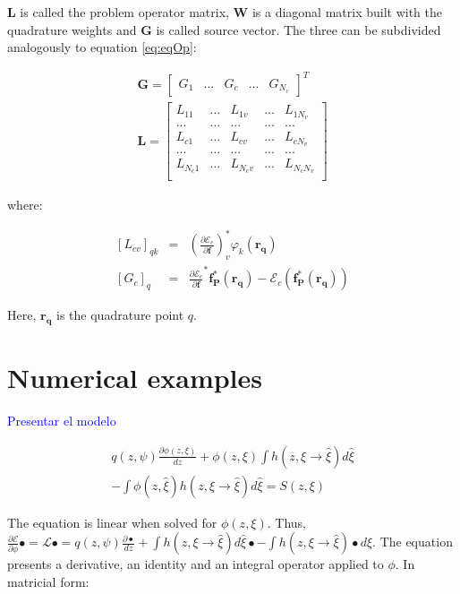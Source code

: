 \documentclass{CFD2011}
\begin{document}
$\mathbf{L}$ is called the problem operator matrix, $\mathbf{W}$ is a diagonal matrix built with the quadrature weights and $\mathbf{G}$ is called source vector. The three can be subdivided analogously to equation \ref{eq:eqOp}:

\begin{eqnarray}
\mathbf{G}=\left[ \begin{array}{ccccc} G_1 & ... & G_{c} & ... & G_{N_c} \end{array} \right]^T \nonumber\\
\mathbf{L}=\left[ \begin{array}{ccccc}
L_{11} & ... & L_{1v} & ... & L_{1N_v} \\
... & ... & ... & ... & ... \\
L_{c1} & ... & L_{cv} & ... & L_{cN_v} \\
... & ... & ... & ... & ... \\
L_{N_c1} & ... & L_{N_cv} & ... & L_{N_cN_v} \\
\end{array} \right] 
\end{eqnarray}

\noindent where:

\begin{eqnarray}
\left[L_{cv}\right]_{qk}&=&\left(\frac{\partial \mathcal{E}_c}{\partial \mathbf{f}}\right)^*_v \varphi_k (\mathbf{r_q}) \nonumber \\
\left[G_{c}\right]_{q}&=&\frac{\partial \mathcal{E}_c}{\partial \mathbf{f}}^*\mathbf{f_P^*}(\mathbf{r_q})-\mathcal{E}_c(\mathbf{f_P^*}(\mathbf{r_q}))
\end{eqnarray}

Here, $\mathbf{r_q}$ is the quadrature point $q$.

\section{Numerical examples}
\textcolor{blue}{Presentar el modelo}

\begin{eqnarray}
q(z,\psi)\frac{\partial \phi(z,\xi)}{dz} +\phi(z,\xi)\int h(z,\xi\rightarrow\hat{\xi})d\hat{\xi} \nonumber \\
-\int \phi(z,\hat{\xi}) h(z,\xi\rightarrow\hat{\xi})d\hat{\xi} = S(z,\xi)
\end{eqnarray}

The equation is linear when solved for $\phi(z,\xi)$. Thus, $\frac{\partial \mathcal{E}}{\partial \phi}\bullet=\mathcal{L}\bullet=q(z,\psi)\frac{\partial \bullet}{dz} +\int h(z,\xi\rightarrow\hat{\xi})d\hat{\xi}\bullet -\int h(z,\xi\rightarrow\hat{\xi})\bullet d\hat{\xi}$. The equation presents a derivative, an identity and an integral operator applied to $\phi$. In matricial form:
\end{document}
